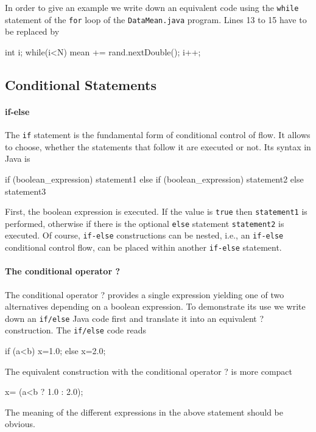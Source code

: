 In order to give an example we write down an equivalent code using
the
\verb|while| statement of the \verb|for| loop of the
\verb|DataMean.java| program. Lines 13 to 15 have to be replaced by
\begin{sverbatim}
int i;
while(i<N){
  mean += rand.nextDouble();
  i++;
}
\end{sverbatim}

\subsection{Conditional Statements}
\paragraph{if-else}
The \verb|if| statement is the fundamental form of conditional control
of flow. It allows to choose, whether the statements that follow it are
executed or not. Its syntax in Java is
\begin{sverbatim}
if (boolean_expression) {
   statement1
}
else if (boolean_expression) {
   statement2
}
else {
   statement3
}
\end{sverbatim}
First, the boolean expression is executed. If the value is \verb|true|
then \verb|statement1| is performed, otherwise if there is the
optional \verb|else| statement \verb|statement2| is executed. Of
course, \verb|if-else| constructions can be nested, i.e., an
\verb|if-else| conditional control flow, can be placed within another
\verb|if-else| statement.

\paragraph{The conditional operator ?} The conditional operator ?
provides a single expression yielding one of two alternatives depending on
a boolean expression. To demonstrate its use we write down an
\verb|if/else| Java code first and translate it into an equivalent  ? 
construction. The \verb|if/else| code reads

\begin{sverbatim}
if (a<b) 
  x=1.0;
else
  x=2.0;
\end{sverbatim}
The equivalent construction with the conditional operator ? is more
compact
\begin{sverbatim}
x= (a<b ? 1.0 : 2.0);
\end{sverbatim}
The meaning of the different expressions in the above statement should
be obvious.


